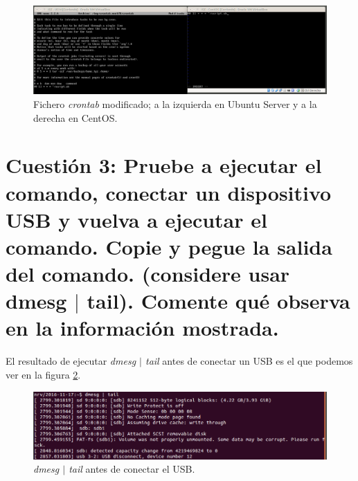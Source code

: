 \documentclass[a4paper,titlepage,12pt]{scrartcl}	%
\numberwithin{figure}{section} %
\numberwithin{table}{section} %
\begin{document}
	\begin{figure}[H]
		\includegraphics[width=\linewidth]{./Imagenes/2-crontab-mod.png}
		\vspace{-0.5cm}
		\caption[Fichero \textit{crontab} modificado; a la izquierda en Ubuntu Server y a la derecha en CentOS.]{Fichero \textit{crontab} modificado; a la izquierda en Ubuntu Server y a la derecha en CentOS.}
		\label{2-crontab-mod}
	\end{figure}
	
	\section[Cuestión 3: Pruebe a ejecutar el comando, conectar un dispositivo USB y vuelva a ejecutar el comando. Copie y pegue la salida del comando. (considere usar dmesg $\mid$ tail). Comente qué observa en la información mostrada.]{Cuestión 3: Pruebe a ejecutar el comando, conectar un dispositivo USB y vuelva a ejecutar el comando. Copie y pegue la salida del comando. (considere usar dmesg $\mid$ tail). Comente qué observa en la información mostrada.}
	
	El resultado de ejecutar \textit{dmesg $\mid$ tail} antes de conectar un USB es el que podemos ver en la figura \ref{3-antes}.
	
	\begin{figure}[H]
		\includegraphics[width=\linewidth]{./Imagenes/3-antes.png}
		\vspace{-0.5cm}
		\caption[\textit{dmesg $\mid$ tail} antes de conectar el USB.]{\textit{dmesg $\mid$ tail} antes de conectar el USB.}
		\label{3-antes}
	\end{figure}
	
\end{document}
